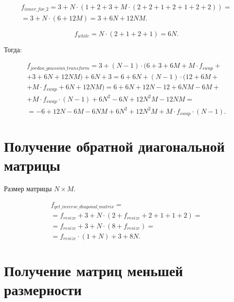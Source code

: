 \begin{equation}
	\begin{gathered}
		f_{inner\_for\_2} = 3 + N \cdot (1 + 2 + 3 + M \cdot (2 + 2 + 1 + 2 + 1 + 2 + 2)) =\\=
		3 + N \cdot (6 + 12M) = 3 + 6N + 12NM.
	\end{gathered}
\end{equation}

\begin{equation}
	f_{while} = N \cdot (2 + 1 + 2 + 1) = 6N.
\end{equation}

Тогда:

\begin{equation}
	\begin{gathered}
		f_{jordan\_gaussian\_transform} = 3 + (N - 1) \cdot (6 + 3 + 6M + M \cdot f_{swap} +\\+ 3 + 6N+ 12NM)  + 6N + 3 = 6 + 6N + (N - 1) \cdot (12 + 6M +\\+ M \cdot f_{swap} + 6N + 12NM) = 6 + 6N + 12N - 12 + 6NM - 6M +\\+ M \cdot f_{swap} \cdot (N - 1) + 6N^2 - 6N + 12N^2M - 12NM =\\= -6 + 12N - 6M - 6NM + 6N^2 + 12N^2M + M \cdot f_{swap} \cdot (N - 1).
	\end{gathered}
\end{equation}

\section{Получение обратной диагональной матрицы}

Размер матрицы $N \times M$.

\begin{equation}
	\begin{gathered}
		f_{get\_inverse\_diagonal\_matrix} =\\= f_{resize} + 3 + N \cdot (2 + f_{resize} + 2 + 1 + 1 + 2) =\\= f_{resize} + 3 + N \cdot (8 + f_{resize}) =\\
		=f_{resize} \cdot (1 + N) + 3 + 8N.
	\end{gathered}
\end{equation}

\section{Получение матриц меньшей размерности}

